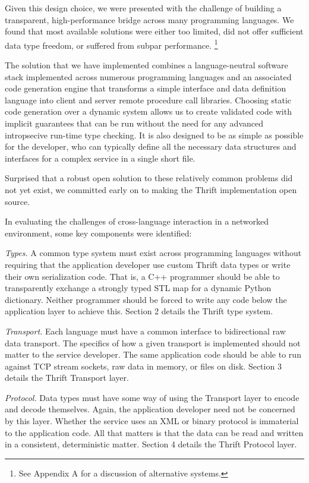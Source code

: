 \documentclass[nocopyrightspace,blockstyle]{sigplanconf}
\begin{document}
Given this design choice, we were presented with the challenge of building
a transparent, high-performance bridge across many programming languages.
We found that most available solutions were either too limited, did not offer
sufficient data type freedom, or suffered from subpar performance.
\footnote{See Appendix A for a discussion of alternative systems.}

The solution that we have implemented combines a language-neutral software
stack implemented across numerous programming languages and an associated code
generation engine that transforms a simple interface and data definition
language into client and server remote procedure call libraries.
Choosing static code generation over a dynamic system allows us to create
validated code with implicit guarantees that can be run without the need for
any advanced intropsecive run-time type checking. It is also designed to
be as simple as possible for the developer, who can typically define all
the necessary data structures and interfaces for a complex service in a single
short file.

Surprised that a robust open solution to these relatively common problems
did not yet exist, we committed early on to making the Thrift implementation
open source.

In evaluating the challenges of cross-language interaction in a networked
environment, some key components were identified:

\textit{Types.} A common type system must exist across programming languages
without requiring that the application developer use custom Thrift data types
or write their own serialization code. That is,
a C++ programmer should be able to transparently exchange a strongly typed
STL map for a dynamic Python dictionary. Neither
programmer should be forced to write any code below the application layer
to achieve this. Section 2 details the Thrift type system. 

\textit{Transport.} Each language must have a common interface to
bidirectional raw data transport. The specifics of how a given
transport is implemented should not matter to the service developer.
The same application code should be able to run against TCP stream sockets,
raw data in memory, or files on disk. Section 3 details the Thrift Transport
layer.

\textit{Protocol.} Data types must have some way of using the Transport
layer to encode and decode themselves. Again, the application
developer need not be concerned by this layer. Whether the service uses
an XML or binary protocol is immaterial to the application code.
All that matters is that the data can be read and written in a consistent,
deterministic matter. Section 4 details the Thrift Protocol layer.
\end{document}

